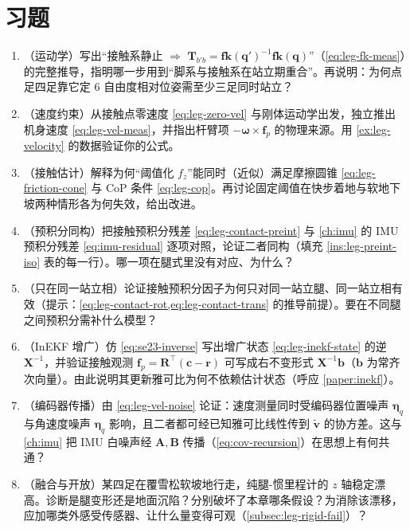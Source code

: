 \section*{习题}
\begin{enumerate}
  \item （运动学）写出“接触系静止 $\Rightarrow$ $\mathbf{T}_{b'b}=\mathbf{fk}(\mathbf{q}')^{-1}\mathbf{fk}(\mathbf{q})$”（\cref{eq:leg-fk-meas}）的完整推导，指明哪一步用到“脚系与接触系在站立期重合”。再说明：为何点足四足靠它定 $6$ 自由度相对位姿需至少三足同时站立？
  \item （速度约束）从接触点零速度 \cref{eq:leg-zero-vel} 与刚体运动学出发，独立推出机身速度 \cref{eq:leg-vel-meas}，并指出杆臂项 $-\boldsymbol{\omega}\times\mathbf{f}_p$ 的物理来源。用 \cref{ex:leg-velocity} 的数据验证你的公式。
  \item （接触估计）解释为何“阈值化 $f_z$”能同时（近似）满足摩擦圆锥 \cref{eq:leg-friction-cone} 与 CoP 条件 \cref{eq:leg-cop}。再讨论固定阈值在快步着地与软地下坡两种情形各为何失效，给出改进。
  \item （预积分同构）把接触预积分残差 \cref{eq:leg-contact-preint} 与 \cref{ch:imu} 的 IMU 预积分残差 \cref{eq:imu-residual} 逐项对照，论证二者同构（填充 \cref{ins:leg-preint-iso} 表的每一行）。哪一项在腿式里没有对应、为什么？
  \item （只在同一站立相）论证接触预积分因子为何只对同一站立腿、同一站立相有效（提示：\cref{eq:leg-contact-rot,eq:leg-contact-trans} 的推导前提）。要在不同腿之间预积分需补什么模型？
  \item （InEKF 增广）仿 \cref{eq:se23-inverse} 写出增广状态 \cref{eq:leg-inekf-state} 的逆 $\mathbf{X}^{-1}$，并验证接触观测 $\mathbf{f}_p=\mathbf{R}^\top(\mathbf{c}-\mathbf{r})$ 可写成右不变形式 $\mathbf{X}^{-1}\mathbf{b}$（$\mathbf{b}$ 为常齐次向量）。由此说明其更新雅可比为何不依赖估计状态（呼应 \cref{paper:inekf}）。
  \item （编码器传播）由 \cref{eq:leg-vel-noise} 论证：速度测量同时受编码器位置噪声 $\boldsymbol{\eta}_q$ 与角速度噪声 $\boldsymbol{\eta}_{\dot{q}}$ 影响，且二者都可经已知雅可比线性传到 $\tilde{\mathbf{v}}$ 的协方差。这与 \cref{ch:imu} 把 IMU 白噪声经 $\mathbf{A},\mathbf{B}$ 传播（\cref{eq:cov-recursion}）在思想上有何共通？
  \item （融合与开放）某四足在覆雪松软坡地行走，纯腿-惯里程计的 $z$ 轴稳定漂高。诊断是腿变形还是地面沉陷？分别破坏了本章哪条假设？为消除该漂移，应加哪类外感受传感器、让什么量变得可观（\cref{subsec:leg-rigid-fail}）？
\end{enumerate}

